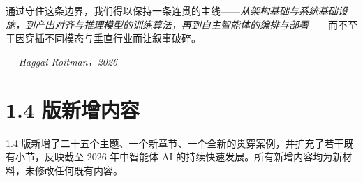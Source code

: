 \documentclass[11pt,a4paper,openany]{book}
\begin{document}
通过守住这条边界，我们得以保持一条连贯的主线——\emph{从架构基础与系统基础设施，到产出对齐与推理模型的训练算法，再到自主智能体的编排与部署}——而不至于因穿插不同模态与垂直行业而让叙事破碎。

--- \emph{Haggai Roitman，2026}

\newpage
\section*{1.4 版新增内容}
\label{whats-new-v14}

1.4 版新增了二十五个主题、一个新章节、一个全新的贯穿案例，并扩充了若干既有小节，反映截至 2026 年中智能体 AI 的持续快速发展。所有新增内容均为新材料，未修改任何既有内容。
\end{document}
